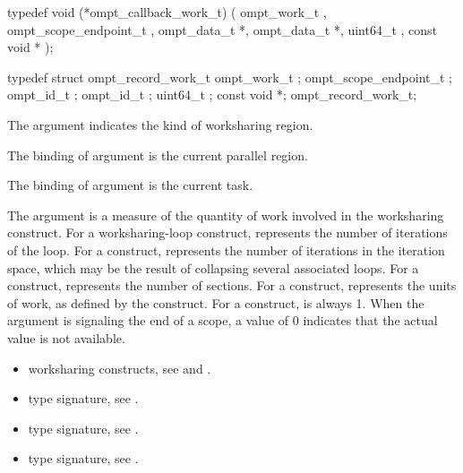 \label{sec:ompt_callback_work_t}
\format

\begin{ccppspecific}
\begin{omptCallback}
typedef void (*ompt_callback_work_t) (
  ompt_work_t ,
  ompt_scope_endpoint_t ,
  ompt_data_t *,
  ompt_data_t *,
  uint64_t ,
  const void *
);
\end{omptCallback}
\end{ccppspecific}


\record

\begin{ccppspecific}
\begin{omptRecord}
typedef struct ompt_record_work_t {
  ompt_work_t ;
  ompt_scope_endpoint_t ;
  ompt_id_t ;
  ompt_id_t ;
  uint64_t ;
  const void *;
} ompt_record_work_t;
\end{omptRecord}
\end{ccppspecific}


\argdesc

The argument  indicates the kind of worksharing
region.

\epdesc

The binding of argument  is the current
parallel region.

The binding of argument  is the current task.

The argument  is a measure of the quantity of work involved in the worksharing construct.
For a worksharing-loop construct,  represents the number of iterations of the loop.
For a  construct,  represents the number of iterations in the iteration space,
which may be the result of collapsing several associated loops.
For a  construct,  represents the number of sections.
For a  construct,  represents the units of work, as defined by the  construct.
For a  construct,  is always 1.
When the  argument is signaling the end of a scope, a  value of 0 indicates that the actual  value is not available.

\codeptrdesc


\crossreferences
\begin{itemize}
\item worksharing constructs, see  and .
\item {} type signature, see
.
\item {} type signature, see
.
\item {} type signature, see
.
\end{itemize}



